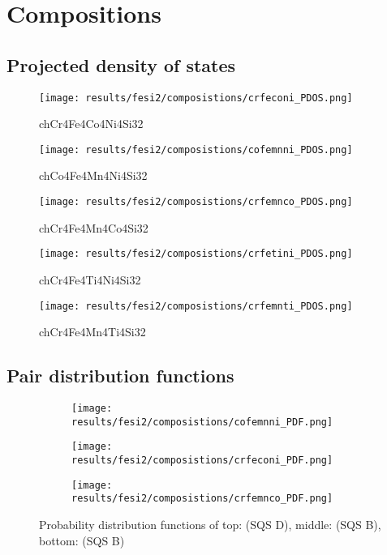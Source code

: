 \chapter{Compositions}
\label{appendix:dos}

\section{Projected density of states}

\begin{figure}[H]
	\texttt{[image: results/fesi2/composistions/crfeconi\_PDOS.png]}
	\caption{ch{Cr4Fe4Co4Ni4Si32}}
\end{figure}

\begin{figure}[H]
	\texttt{[image: results/fesi2/composistions/cofemnni\_PDOS.png]}
	\caption{ch{Co4Fe4Mn4Ni4Si32}}
\end{figure}

\begin{figure}[H]
	\texttt{[image: results/fesi2/composistions/crfemnco\_PDOS.png]}
	\caption{ch{Cr4Fe4Mn4Co4Si32}}

\end{figure}

\begin{figure}[H]
	\texttt{[image: results/fesi2/composistions/crfetini\_PDOS.png]}
	\caption{ch{Cr4Fe4Ti4Ni4Si32}}

\end{figure}

\begin{figure}[H]
	\texttt{[image: results/fesi2/composistions/crfemnti\_PDOS.png]}
	\caption{ch{Cr4Fe4Mn4Ti4Si32}}
\end{figure}

\section{Pair distribution functions}

\begin{figure}[H]
	\centering
	\begin{subfigure}{\textwidth}
		\texttt{[image: results/fesi2/composistions/cofemnni\_PDF.png]}
	\end{subfigure}
	\begin{subfigure}{\textwidth}
		\texttt{[image: results/fesi2/composistions/crfeconi\_PDF.png]}
	\end{subfigure}
	\begin{subfigure}{\textwidth}
		\texttt{[image: results/fesi2/composistions/crfemnco\_PDF.png]}
	\end{subfigure}
	\caption{Probability distribution functions of top:  (SQS D), middle:  (SQS B), bottom:  (SQS B)}
\end{figure}


